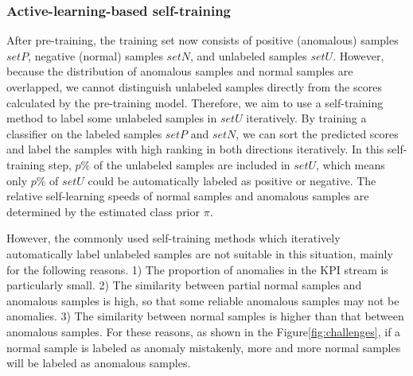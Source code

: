 \subsubsection{Active-learning-based self-training}
\label{subsubsubsec:Active learning}
After pre-training, the training set now consists of positive (anomalous) samples $setP$, negative (normal) samples $setN$, and unlabeled samples $setU$. However, because the distribution of anomalous samples and normal samples are overlapped, we cannot distinguish unlabeled samples directly from the scores calculated by the pre-training model. Therefore, we aim to use a self-training method to label some unlabeled samples in $setU$ iteratively. 
By training a classifier on the labeled samples $setP$ and $setN$, we can sort the predicted scores and label the samples with high ranking in both directions iteratively. In this self-training step, $p\%$ of the unlabeled samples are included in $setU$, which means only $p\%$ of $setU$ could be automatically labeled as positive or negative.
The relative self-learning speeds of normal samples and anomalous samples are determined by the estimated class prior $\pi$.
\par
However, the commonly used self-training methods which iteratively automatically label unlabeled samples are not suitable in this situation, mainly for the following reasons. 1) The proportion of anomalies in the KPI stream is particularly small. 2) The similarity between partial normal samples and anomalous samples is high, so that some reliable anomalous samples may not be anomalies. 3) The similarity between normal samples is higher than that between anomalous samples. For these reasons, as shown in the Figure\ref{fig:challenges}, if a normal sample is labeled as anomaly mistakenly, more and more normal samples will be labeled as anomalous samples.

